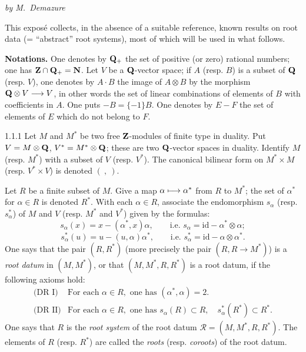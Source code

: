 \label{XXI}
\begin{center}\textit{by M.~Demazure}\end{center}
{\renewcommand{\thefootnote}{(0)}}%
This expos\'e collects, in the absence of a suitable reference,{\renewcommand{\thefootnote}{(1)}} known results on root data (= ``abstract'' root systems), most of which will be used in what follows.

\textbf{Notations.} One denotes by $\mathbf{Q}_+$ the set of positive (or zero) rational numbers; one has $\mathbf{Z}\cap\mathbf{Q}_+=\mathbf{N}$. Let $V$ be a $\mathbf{Q}$-vector space; if $A$ (resp. $B$) is a subset of $\mathbf{Q}$ (resp. $V$), one denotes by $A\cdot B$ the image of $A\otimes B$ by the morphism $\mathbf{Q}\otimes V\longrightarrow V$, in other words the set of linear combinations of elements of $B$ with coefficients in $A$. One puts $-B=\{-1\}B$. One denotes by $E-F$ the set of elements of $E$ which do not belong to $F$.

\label{XXI.sec.1}
\begin{definition}{1.1.1}\label{XXI.1.1.1}
Let $M$ and $M^*$ be two free $\mathbf{Z}$-modules of finite type in duality. Put $V=M\otimes\mathbf{Q}$, $V^*=M^*\otimes\mathbf{Q}$; these are two $\mathbf{Q}$-vector spaces in duality. Identify $M$ (resp. $M^*$) with a subset of $V$ (resp. $V^*$). The canonical bilinear form on $M^*\times M$ (resp. $V^*\times V$) is denoted $(\ ,\ )$.

Let $R$ be a finite subset of $M$. Give a map $\alpha\longmapsto\alpha^*$ from $R$ to $M^*$; the set of $\alpha^*$ for $\alpha\in R$ is denoted $R^*$. With each $\alpha\in R$, associate the endomorphism $s_\alpha$ (resp. $s_\alpha^*$) of $M$ and $V$ (resp. $M^*$ and $V^*$) given by the formulas:
\begin{equation}\tag{1}\label{XXI.eq.1}
s_\alpha(x)=x-(\alpha^*,x)\alpha,\qquad\text{i.e. }s_\alpha=\mathrm{id}-\alpha^*\otimes\alpha;
\end{equation}
\begin{equation}\tag{$1^*$}\label{XXI.eq.1star}
s_\alpha^*(u)=u-(u,\alpha)\alpha^*,\qquad\text{i.e. }s_\alpha^*=\mathrm{id}-\alpha\otimes\alpha^*.
\end{equation}
One says that the pair $(R,R^*)$ (more precisely the pair $(R,R\to M^*)$) is a \emph{root datum} in $(M,M^*)$, or that $(M,M^*,R,R^*)$ is a root datum, if the following axioms hold:
\[
\begin{array}{ll}
\text{(DR I)}&\text{For each }\alpha\in R,\text{ one has }(\alpha^*,\alpha)=2.\\
\text{(DR II)}&\text{For each }\alpha\in R,\text{ one has }s_\alpha(R)\subset R,\quad s_\alpha^*(R^*)\subset R^*.
\end{array}
\]
One says that $R$ is the \emph{root system} of the root datum $\mathcal R=(M,M^*,R,R^*)$. The elements of $R$ (resp. $R^*$) are called the \emph{roots} (resp. \emph{coroots}) of the root datum.
\end{definition}

